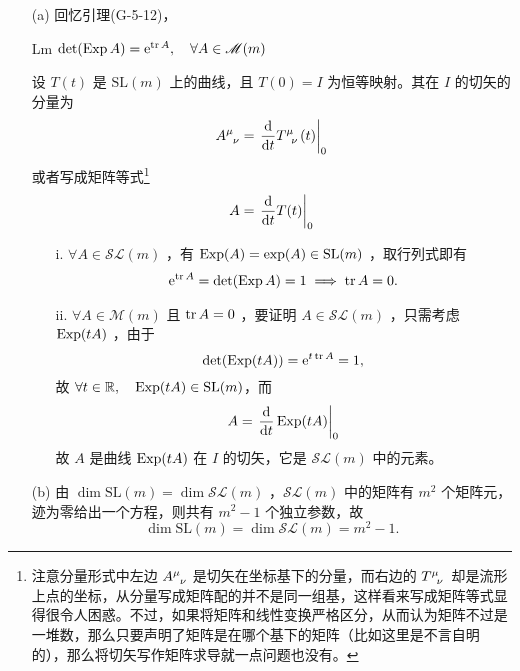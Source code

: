 \begin{xiti}
    \begin{zm}
    	\begin{enumerate}
    		\item[(a)] 回忆引理(G-5-12)，
    		\begin{yl}{Lm}
    			$\det(\Exp A)=\e{\tr A}\qc \forall A\in \mathscr{M}(m)$
    		\end{yl}
    	    设 $T(t)$ 是 $\mathrm{SL}(m)$ 上的曲线，且 $T(0)=I$ 为恒等映射。其在 $I$ 的切矢的分量为
    	    \begin{displaymath}
    	    \tensor{A}{^\mu_\nu} = \left. \dv{t} \tensor{T}{^\mu_\nu}(t) \right|_0
    	    \end{displaymath}
    	    或者写成矩阵等式\footnote{注意分量形式中左边 $\tensor{A}{^\mu_\nu}$ 是切矢在坐标基下的分量，而右边的 $\tensor{T}{^\mu_\nu}$ 却是流形上点的坐标，从分量写成矩阵配的并不是同一组基，这样看来写成矩阵等式显得很令人困惑。不过，如果将矩阵和线性变换严格区分，从而认为矩阵不过是一堆数，那么只要声明了矩阵是在哪个基下的矩阵（比如这里是不言自明的），那么将切矢写作矩阵求导就一点问题也没有。}
    	    \begin{displaymath}
    	    A=\left. \dv{t} T(t) \right|_0
    	    \end{displaymath}
    	    \begin{enumerate}[leftmargin=2em]
    	    	\item[i.] $\forall A\in \mathscr{S\!\!L}(m)$ ，有 $\operatorname{Exp}(A) = \exp(A) \in \mathrm{SL}(m)$ ，取行列式即有
    	    	\begin{align*}
    	    	\mathrm{e}^{\tr A} = \det(\operatorname{Exp} A) = 1 \implies \tr A=0.
    	    	\end{align*}
    	    	\item[ii.] $\forall A\in \mathscr{M}(m)$ 且 $\tr A=0$ ，要证明 $A\in \mathscr{S\!\!L}(m)$ ，只需考虑 $\operatorname{Exp}(tA)$ ，由于
    	    	\begin{displaymath}
    	    	\det(\operatorname{Exp}(tA)) = \mathrm{e}^{t\tr A} = 1,
    	    	\end{displaymath}
    	    	故 $\forall t\in \mathbb{R}\qc \Exp(tA) \in \mathrm{SL}(m)$，而
    	    	\begin{displaymath}
    	    	A=\left. \dv{t} \operatorname{Exp}(tA) \right|_0
    	    	\end{displaymath}
    	    	故 $A$ 是曲线 $\operatorname{Exp}(tA)$ 在 $I$ 的切矢，它是 $\mathscr{S\!\!L}(m)$ 中的元素。
    	    \end{enumerate}
            \item[(b)] 由 $\dim \mathrm{SL}(m) = \dim \mathscr{S\!\!L}(m)$ ，$\mathscr{S\!\!L}(m)$ 中的矩阵有 $m^2$ 个矩阵元，迹为零给出一个方程，则共有 $m^2-1$ 个独立参数，故 \[\dim \mathrm{SL}(m) = \dim \mathscr{S\!\!L}(m)=m^2-1.\]
    	\end{enumerate}
    \end{zm}
	

\end{xiti}

